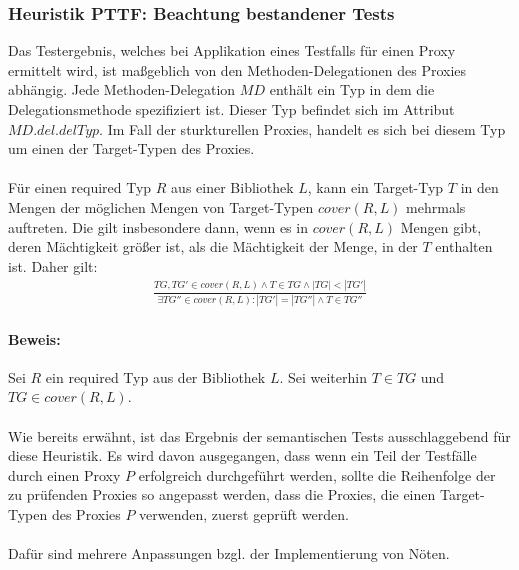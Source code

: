\subsubsection{Heuristik PTTF: Beachtung bestandener Tests}
Das Testergebnis, welches bei Applikation eines Testfalls für einen Proxy ermittelt wird, ist maßgeblich von den Methoden-Delegationen des Proxies abhängig. Jede Methoden-Delegation $\mathit{MD}$ enthält ein Typ in dem die Delegationsmethode spezifiziert ist. Dieser Typ befindet sich im Attribut $\mathit{MD.del.delTyp}$. Im Fall der sturkturellen Proxies, handelt es sich bei diesem Typ um einen der Target-Typen des Proxies.\\\\
Für einen required Typ $R$ aus einer Bibliothek $L$, kann ein Target-Typ $T$ in den Mengen der möglichen Mengen von Target-Typen $\mathit{cover(R,L)}$ mehrmals auftreten. Die gilt insbesondere dann, wenn es in $\mathit{cover(R,L)}$ Mengen gibt, deren Mächtigkeit größer ist, als die Mächtigkeit der Menge, in der $T$ enthalten ist. Daher gilt:
\begin{gather*}
\frac{\mathit{TG},\mathit{TG'} \in \mathit{cover(R,L)} \wedge T \in \mathit{TG} \wedge |\mathit{TG}| < |\mathit{TG'}|}{\exists \mathit{TG''} \in \mathit{cover(R,L)} : |\mathit{TG'}| = |\mathit{TG''}| \wedge T \in \mathit{TG''}}
\end{gather*}
\noindent
\paragraph{Beweis:}
Sei $R$ ein required Typ aus der Bibliothek $L$. Sei weiterhin $T \in \mathit{TG}$ und $\mathit{TG} \in \mathit{cover(R,L)}$.
\\\\
Wie bereits erwähnt, ist das Ergebnis der semantischen Tests ausschlaggebend für diese Heuristik. Es wird davon ausgegangen, dass wenn ein Teil der Testfälle durch einen Proxy $P$ erfolgreich durchgeführt werden, sollte die Reihenfolge der zu prüfenden Proxies so angepasst werden, dass die Proxies, die einen Target-Typen des Proxies $P$ verwenden, zuerst geprüft werden.\\\\
Dafür sind mehrere Anpassungen bzgl. der Implementierung von Nöten. 

